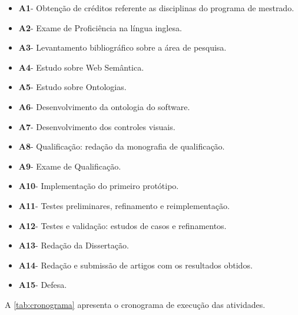 \begin{itemize}
  \label{tab:atividades}
  \item \textbf{A1}- Obtenção de créditos referente as disciplinas do programa de mestrado.
  \item \textbf{A2}- Exame de Proficiência na língua inglesa.
  \item \textbf{A3}- Levantamento bibliográfico sobre a área de pesquisa.
  \item \textbf{A4}- Estudo sobre Web Semântica.
  \item \textbf{A5}- Estudo sobre Ontologias.
  \item \textbf{A6}- Desenvolvimento da ontologia do software.
  \item \textbf{A7}- Desenvolvimento dos controles visuais.
  \item \textbf{A8}- Qualificação: redação da monografia de qualificação.
  \item \textbf{A9}- Exame de Qualificação.
  \item \textbf{A10}- Implementação do primeiro protótipo.
  \item \textbf{A11}- Testes preliminares, refinamento e reimplementação.
  \item \textbf{A12}- Testes e validação: estudos de casos e refinamentos.
  \item \textbf{A13}- Redação da Dissertação.
  \item \textbf{A14}- Redação e submissão de artigos com os resultados obtidos.
  \item \textbf{A15}- Defesa.

\end{itemize}

A \autoref{tab:cronograma} apresenta o cronograma de execução das atividades.


